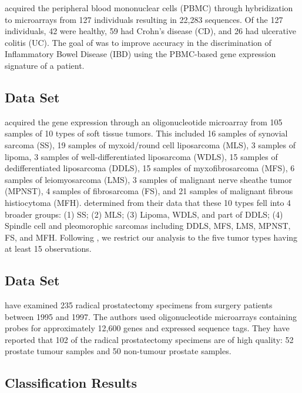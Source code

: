\documentclass[11pt]{article}
\begin{document}
\cite{Burczynski:2006ik} acquired the peripheral blood mononuclear cells (PBMC) through hybridization to microarrays from 127 individuals resulting in 22,283 sequences. Of the 127 individuals, 42 were healthy, 59 had Crohn's disease (CD), and 26 had ulcerative colitis (UC). The goal of \cite{Burczynski:2006ik} was to improve accuracy in the discrimination of Inflammatory Bowel Disease (IBD) using the PBMC-based gene expression signature of a patient.

\subsection{\cite{Nakayama:2007fl} Data Set}

\cite{Nakayama:2007fl} acquired the gene expression through an oligonucleotide microarray from 105 samples of 10 types of soft tissue tumors. This included 16 samples of synovial sarcoma (SS), 19 samples of myxoid/round cell liposarcoma (MLS), 3 samples of lipoma, 3 samples of well-differentiated liposarcoma (WDLS), 15 samples of dedifferentiated liposarcoma (DDLS), 15 samples of myxofibrosarcoma (MFS), 6 samples of leiomyosarcoma (LMS), 3 samples of malignant nerve sheathe tumor (MPNST), 4 samples of fibrosarcoma (FS), and 21 samples of malignant fibrous histiocytoma (MFH). \cite{Nakayama:2007fl} determined from their data that these 10 types fell into 4 broader groups: (1) SS; (2) MLS; (3) Lipoma, WDLS, and part of DDLS; (4) Spindle cell and pleomorophic sarcomas including DDLS, MFS, LMS, MPNST, FS, and MFH. Following \cite{Witten:2011kc}, we restrict our analysis to the five tumor types having at least 15 observations.

\subsection{\cite{Singh:2002fh} Data Set}

\cite{Singh:2002fh} have examined 235 radical prostatectomy specimens from surgery patients between 1995 and 1997. The authors used oligonucleotide microarrays containing probes for approximately 12,600 genes and expressed sequence tags. They have reported that 102 of the radical prostatectomy specimens are of high quality: 52 prostate tumour samples and 50 non-tumour prostate samples.

\subsection{Classification Results}
\end{document}
